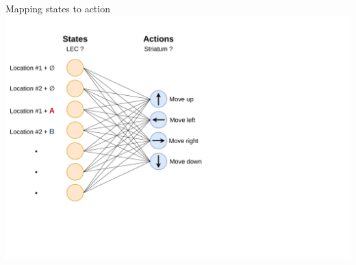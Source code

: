 \documentclass[bigger]{beamer}
\begin{document}
\begin{frame}[label={sec:orgc61aff3}]{Mapping states to action}
\centering
\vspace{2em}
        \includegraphics[height=0.8\textheight, trim=0cm 6cm 15cm 2cm]{img/RL_mapping-states-to-actions.drawio.pdf}
\end{frame}
\end{document}
